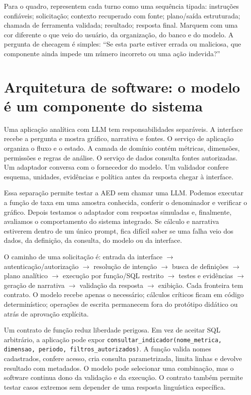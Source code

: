 Para o quadro, representem cada turno como uma sequência tipada: instruções confiáveis; solicitação; contexto recuperado com fonte; plano/saída estruturada; chamada de ferramenta validada; resultado; resposta final. Marquem com uma cor diferente o que veio do usuário, da organização, do banco e do modelo. A pergunta de checagem é simples: ``Se esta parte estiver errada ou maliciosa, que componente ainda impede um número incorreto ou uma ação indevida?''

\section{Arquitetura de software: o modelo é um componente do sistema}

Uma aplicação analítica com LLM tem responsabilidades separáveis. A interface recebe a pergunta e mostra gráfico, narrativa e fontes. O serviço de aplicação organiza o fluxo e o estado. A camada de domínio contém métricas, dimensões, permissões e regras de análise. O serviço de dados consulta fontes autorizadas. Um adaptador conversa com o fornecedor do modelo. Um validador confere esquema, unidades, evidências e política antes da resposta chegar à interface.

Essa separação permite testar a AED sem chamar uma LLM. Podemos executar a função de taxa em uma amostra conhecida, conferir o denominador e verificar o gráfico. Depois testamos o adaptador com respostas simuladas e, finalmente, avaliamos o comportamento do sistema integrado. Se cálculo e narrativa estiverem dentro de um único prompt, fica difícil saber se uma falha veio dos dados, da definição, da consulta, do modelo ou da interface.

O caminho de uma solicitação é: entrada da interface $\rightarrow$ autenticação/autorização $\rightarrow$ resolução de intenção $\rightarrow$ busca de definições $\rightarrow$ plano analítico $\rightarrow$ execução por função/SQL restrito $\rightarrow$ testes e evidências $\rightarrow$ geração de narrativa $\rightarrow$ validação da resposta $\rightarrow$ exibição. Cada fronteira tem contrato. O modelo recebe apenas o necessário; cálculos críticos ficam em código determinístico; operações de escrita permanecem fora do protótipo didático ou atrás de aprovação explícita.

Um contrato de função reduz liberdade perigosa. Em vez de aceitar SQL arbitrário, a aplicação pode expor \texttt{consultar\_indicador(nome\_metrica, dimensao, periodo, filtros\_autorizados)}. A função valida nomes cadastrados, confere acesso, cria consulta parametrizada, limita linhas e devolve resultado com metadados. O modelo pode selecionar uma combinação, mas o software continua dono da validação e da execução. O contrato também permite testar casos extremos sem depender de uma resposta linguística específica.

